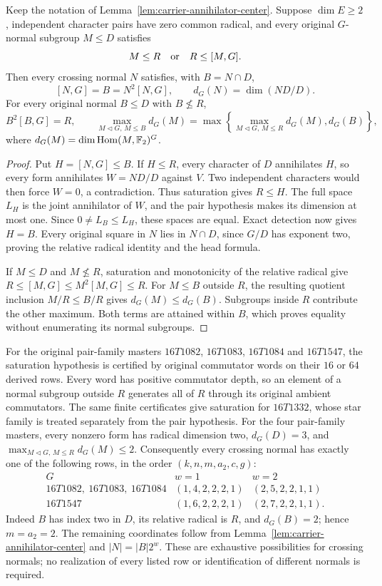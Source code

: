 \begin{lemma}
\label{lem:carrier-saturation-crossing}
Keep the notation of Lemma~\ref{lem:carrier-annihilator-center}.
Suppose $\dim E\geq2$, independent character pairs have zero common
radical, and every original $G$-normal subgroup $M\leq D$ satisfies
\[
 M\leq R\quad\hbox{or}\quad R\leq[M,G].
\]
Then every crossing normal $N$ satisfies, with $B=N\cap D$,
\[
 [N,G]=B=N^2[N,G],\qquad d_G(N)=\dim(ND/D).
\]
For every original normal $B\leq D$ with $B\not\leq R$,
\[
 B^2[B,G]=R,\qquad
 \max_{M\lhd G,\,M\leq B}d_G(M)
 =\max\left\{\max_{M\lhd G,\,M\leq R}d_G(M),d_G(B)\right\},
\]
where $d_G(M)=\dim\operatorname{Hom}(M,\mathbb F_2)^G$.
\end{lemma}
\begin{proof}
Put $H=[N,G]\leq B$. If $H\leq R$, every character of $D$
annihilates $H$, so every form annihilates $W=ND/D$ against $V$.
Two independent characters would then force $W=0$, a contradiction.
Thus saturation gives $R\leq H$. The full space $L_H$ is the joint
annihilator of $W$, and the pair hypothesis makes its dimension at most
one. Since $0\ne L_B\leq L_H$, these spaces are equal. Exact detection
now gives $H=B$. Every original square in $N$ lies in $N\cap D$,
since $G/D$ has exponent two, proving the relative radical identity
and the head formula.

If $M\leq D$ and $M\not\leq R$, saturation and monotonicity of the
relative radical give $R\leq[M,G]\leq M^2[M,G]\leq R$.
For $M\leq B$ outside $R$, the resulting quotient inclusion
$M/R\leq B/R$ gives $d_G(M)\leq d_G(B)$. Subgroups inside $R$
contribute the other maximum. Both terms are attained within $B$,
which proves equality without enumerating its normal subgroups.
\end{proof}

For the original pair-family masters $16T1082$, $16T1083$, $16T1084$
and $16T1547$, the saturation hypothesis is certified by original
commutator words on their $16$ or $64$ derived rows. Every word has
positive commutator depth, so an element of a normal subgroup outside
$R$ generates all of $R$ through its original ambient commutators.
The same finite certificates give saturation for $16T1332$, whose
star family is treated separately from the pair hypothesis.
For the four pair-family masters, every nonzero form has radical
dimension two, $d_G(D)=3$, and
$\max_{M\lhd G,\,M\leq R}d_G(M)\leq2$.
Consequently every crossing normal has exactly one of the following
rows, in the order $(k,n,m,a_2,c,g)$:
\[
\begin{array}{c|cc}
 G & w=1 & w=2\\ \hline
 16T1082,\ 16T1083,\ 16T1084
 &(1,4,2,2,2,1)&(2,5,2,2,1,1)\\
 16T1547 &(1,6,2,2,2,1)&(2,7,2,2,1,1).
\end{array}
\]
Indeed $B$ has index two in $D$, its relative radical is $R$, and
$d_G(B)=2$; hence $m=a_2=2$. The remaining coordinates follow from
Lemma~\ref{lem:carrier-annihilator-center} and $|N|=|B|2^w$.
These are exhaustive possibilities for crossing normals; no realization
of every listed row or identification of different normals is required.

